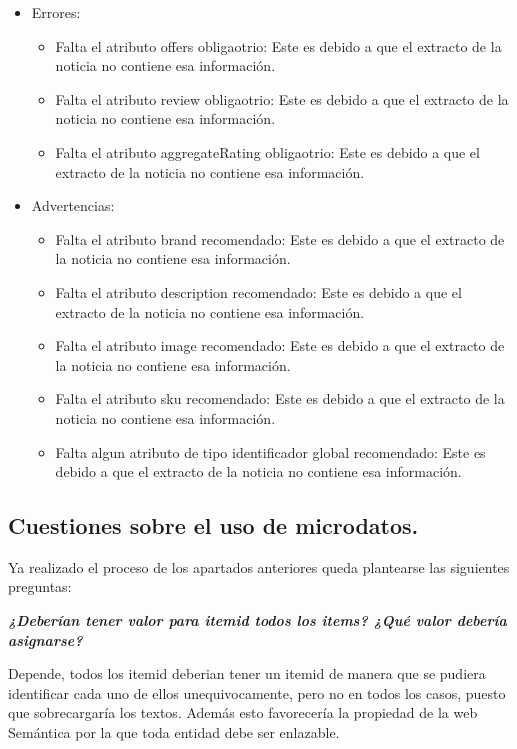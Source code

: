 \documentclass[spanish]{llncs}   %
\begin{document}
\begin{itemize}
    \item Errores:
    \begin{itemize}
        \item Falta el atributo offers obligaotrio: Este es debido a que el extracto de la noticia no contiene esa información.
        \item Falta el atributo review obligaotrio: Este es debido a que el extracto de la noticia no contiene esa información.
        \item Falta el atributo aggregateRating obligaotrio: Este es debido a que el extracto de la noticia no contiene esa información.
    \end{itemize}
    \item Advertencias:
    \begin{itemize}
        \item Falta el atributo brand recomendado: Este es debido a que el extracto de la noticia no contiene esa información.
        \item Falta el atributo description recomendado: Este es debido a que el extracto de la noticia no contiene esa información.
        \item Falta el atributo image recomendado: Este es debido a que el extracto de la noticia no contiene esa información.
        \item Falta el atributo sku recomendado: Este es debido a que el extracto de la noticia no contiene esa información.
        \item Falta algun atributo de tipo identificador global recomendado: Este es debido a que el extracto de la noticia no contiene esa información.
    \end{itemize}
\end{itemize}

\subsection{Cuestiones sobre el uso de microdatos.}

Ya realizado el proceso de los apartados anteriores queda plantearse las siguientes preguntas:

\textbf{\textit{¿Deberían tener valor para itemid todos los items? ¿Qué valor debería asignarse?}}

Depende, todos los itemid deberian tener un itemid de manera que se pudiera identificar cada uno de ellos unequivocamente, 
pero no en todos los casos, puesto que sobrecargaría los textos.
Además esto favorecería la propiedad de la web Semántica por la que toda entidad debe ser enlazable.
\end{document}
